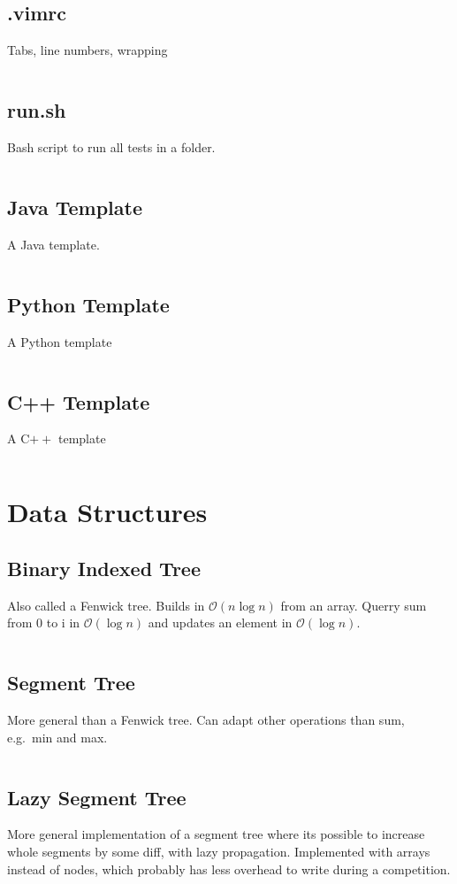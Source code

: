 \documentclass[8pt,a4paper,landscape,oneside]{amsart}
\newcommand{\codej}[1]{\inputminted[fontsize=\large,tabsize=2,baselinestretch=1]{java}{src/#1}}
\newcommand{\codec}[1]{\inputminted[fontsize=\large,tabsize=2,baselinestretch=1]{cpp}{src/#1}}
\newcommand{\codep}[1]{\inputminted[fontsize=\large,tabsize=2,baselinestretch=1]{py}{src/#1}}
\newcommand{\codeb}[1]{\inputminted[fontsize=\large,tabsize=2,baselinestretch=1]{bash}{src/#1}}
\newcommand{\codev}[1]{\inputminted[fontsize=\large,tabsize=2,baselinestretch=1]{vim}{src/#1}}
\newcommand{\bigO}{\mathcal{O}}
\begin{document}
\begin{multicols*}{2}
\begin{large}
    \subsection{.vimrc}
        Tabs, line numbers, wrapping
        \codev{.vimrc}
    \subsection{run.sh}
        Bash script to run all tests in a folder.
        \codeb{run.sh}
    \subsection{Java Template}
        A Java template.
        \codej{template.java}
    \subsection{Python Template}
        A Python template
        \codep{template.py}
    \subsection{C++ Template}
        A C$++$ template
        \codec{template.cpp}

\section{Data Structures}
    \subsection{Binary Indexed Tree}
        Also called a Fenwick tree. Builds in $\bigO(n \log{n})$ from an array. Querry sum from 0 to i in $\bigO(\log{n})$ and updates an element in $\bigO(\log{n})$.
        \codej{datastructures/BIT.java}
    \subsection{Segment Tree}
        More general than a Fenwick tree. Can adapt other operations than sum, e.g.\ min and max.
        \codej{datastructures/ST.java}
    \subsection{Lazy Segment Tree}
        More general implementation of a segment tree where its possible to increase whole segments by some diff, with lazy propagation. Implemented with arrays instead of nodes, which probably has less overhead to write during a competition.
        \codej{datastructures/LazySegmentTree.java}

\end{large}
\end{multicols*}
\end{document}
